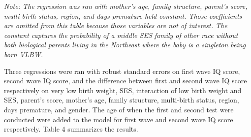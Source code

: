 \documentclass{article}
\begin{document}
\begin{table}[H]
\begin{threeparttable}
\begin{tablenotes}[flushleft]

      \small
      \singlespace
      \item
      \textit{\footnotesize{{Note}: The regression was ran with mother's age, family structure, parent's score, multi-birth status, region, and days premature held constant. Those coefficients are omitted from this table because those variables are not of interest. The constant captures the probability of a middle SES family of other race without both biological parents living in the Northeast where the baby is a singleton being born VLBW.}}   
      
\end{tablenotes}	

\end{threeparttable}

\end{table}


\doublespace 

Three regressions were ran with robust standard errors on first wave IQ score, second wave IQ score, and the difference between first and second wave IQ score respectively on very low birth weight, SES, interaction of low birth weight and SES, parent's score, mother's age, family structure, multi-birth status, region, days premature, and gender. The age of when the first and second test were conducted were added to the model for first wave and second wave IQ score respectively. Table 4 summarizes the results.

\singlespace 
\end{document}
